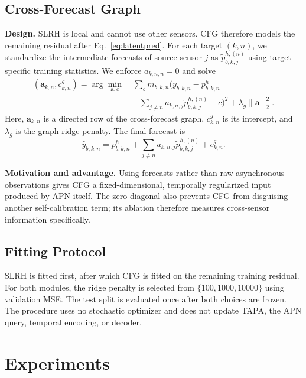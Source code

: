 \documentclass[conference]{IEEEtran}
\begin{document}
\subsection{Cross-Forecast Graph}
\textbf{Design.} SLRH is local and cannot use other sensors. CFG therefore models the remaining residual after Eq.~\eqref{eq:latentpred}. For each target $(k,n)$, we standardize the intermediate forecasts of source sensor $j$ as $\tilde{p}^{h,(n)}_{b,k,j}$ using target-specific training statistics. We enforce $a_{k,n,n}=0$ and solve
\begin{equation}
\begin{split}
(\mathbf{a}_{k,n},c^{g}_{k,n})=\arg\min_{\mathbf{a},c}\;&
\sum_b m_{b,k,n}\Big(y_{b,k,n}-p^{h}_{b,k,n}\\
&-\sum_{j\ne n}a_{k,n,j}\tilde{p}^{h,(n)}_{b,k,j}-c\Big)^2
+\lambda_g\lVert\mathbf{a}\rVert_2^2 .
\end{split}
\label{eq:cfg}
\end{equation}
Here, $\mathbf{a}_{k,n}$ is a directed row of the cross-forecast graph, $c^{g}_{k,n}$ is its intercept, and $\lambda_g$ is the graph ridge penalty. The final forecast is
\begin{equation}
\hat{y}_{b,k,n}=p^{h}_{b,k,n}+\sum_{j\ne n}a_{k,n,j}\tilde{p}^{h,(n)}_{b,k,j}+c^{g}_{k,n}.
\label{eq:final}
\end{equation}

\textbf{Motivation and advantage.} Using forecasts rather than raw asynchronous observations gives CFG a fixed-dimensional, temporally regularized input produced by APN itself. The zero diagonal also prevents CFG from disguising another self-calibration term; its ablation therefore measures cross-sensor information specifically.

\subsection{Fitting Protocol}
SLRH is fitted first, after which CFG is fitted on the remaining training residual. For both modules, the ridge penalty is selected from $\{100,1000,10000\}$ using validation MSE. The test split is evaluated once after both choices are frozen. The procedure uses no stochastic optimizer and does not update TAPA, the APN query, temporal encoding, or decoder.

\section{Experiments}
\end{document}
